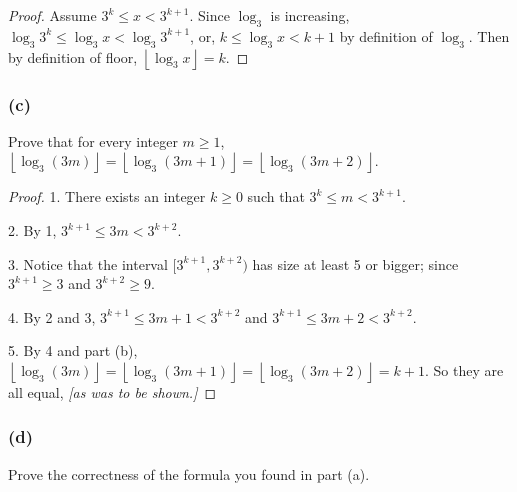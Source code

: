 \documentclass[14pt]{extarticle}
\newcommand{\floor}[1]{{\left\lfloor#1\right\rfloor}}
\begin{document}
\begin{proof}
Assume \(3^k \leq x < 3^{k+1}\). Since \(\log_3\) is increasing, \(\log_3 3^k \leq \log_3 x < \log_3 3^{k+1}\), or,
\(k \leq \log_3 x < k+1\) by definition of \(\log_3\). Then by definition of floor, \(\floor{\log_3 x} = k\).
\end{proof}

\subsubsection{(c)}
Prove that for every integer \(m \geq1\), \(\floor{\log_3(3m)} = \floor{\log_3(3m + 1)} = \floor{\log_3(3m + 2)}\).

\begin{proof}
1. There exists an integer \(k \geq 0\) such that \(3^k \leq m < 3^{k+1}\).

2. By 1, \(3^{k+1} \leq 3m < 3^{k+2}\). 

3. Notice that the interval \([3^{k+1}, 3^{k+2})\) has size at least 5 or bigger; since \(3^{k+1} \geq 3\) and 
\(3^{k+2} \geq 9\).

4. By 2 and 3, \(3^{k+1} \leq 3m + 1 < 3^{k+2}\) and \(3^{k+1} \leq 3m + 2 < 3^{k+2}\).

5. By 4 and part (b), \(\floor{\log_3(3m)} = \floor{\log_3(3m + 1)} = \floor{\log_3(3m + 2)} = k+1\). 
So they are all equal, {\it [as was to be shown.]}
\end{proof}

\subsubsection{(d)}
Prove the correctness of the formula you found in part (a).
\end{document}
